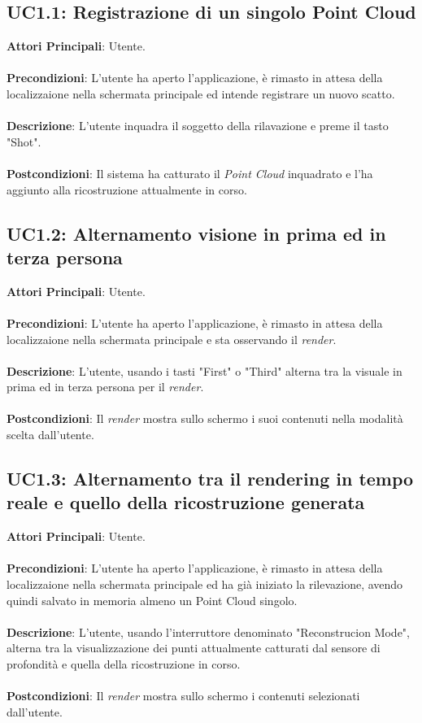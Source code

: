 \subsection{UC1.1: Registrazione di un singolo Point Cloud}
\textbf{Attori Principali}: Utente.
\\\\ \textbf{Precondizioni}:  L'utente ha aperto l'applicazione, è rimasto in attesa della localizzaione nella schermata principale ed intende registrare un nuovo scatto.
\\\\ \textbf{Descrizione}: L'utente inquadra il soggetto della rilavazione e preme il tasto "Shot".
\\\\ \textbf{Postcondizioni}: Il sistema ha catturato il \emph{Point Cloud} inquadrato e l'ha aggiunto alla ricostruzione attualmente in corso.

\subsection{UC1.2: Alternamento visione in prima ed in terza persona}
\textbf{Attori Principali}: Utente.
\\\\ \textbf{Precondizioni}: L'utente ha aperto l'applicazione, è rimasto in attesa della localizzaione nella schermata principale e sta osservando il \emph{render}.
\\\\ \textbf{Descrizione}: L'utente, usando i tasti "First" o "Third" alterna tra la visuale in prima ed in terza persona per il \emph{render}.
\\\\ \textbf{Postcondizioni}: Il \emph{render} mostra sullo schermo i suoi contenuti nella modalità scelta dall'utente.

\subsection{UC1.3: Alternamento tra il rendering in tempo reale e quello della ricostruzione generata}
\textbf{Attori Principali}: Utente.
\\\\ \textbf{Precondizioni}: L'utente ha aperto l'applicazione, è rimasto in attesa della localizzaione nella schermata principale ed ha già iniziato la rilevazione, avendo quindi salvato in memoria almeno un Point Cloud singolo.
\\\\ \textbf{Descrizione}: L'utente, usando l'interruttore denominato "Reconstrucion Mode", alterna tra la visualizzazione dei punti attualmente catturati dal sensore di profondità e quella della ricostruzione in corso.
\\\\ \textbf{Postcondizioni}: Il \emph{render} mostra sullo schermo i contenuti selezionati dall'utente.

